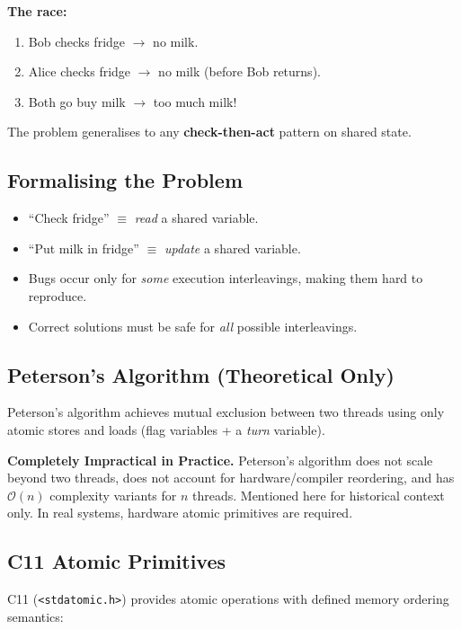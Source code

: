 \documentclass[11pt,a4paper]{article}
\newcommand{\code}[1]{\texttt{#1}}
\begin{document}
\textbf{The race:}
\begin{enumerate}
  \item Bob checks fridge $\to$ no milk.
  \item Alice checks fridge $\to$ no milk (before Bob returns).
  \item Both go buy milk $\to$ too much milk!
\end{enumerate}

The problem generalises to any \textbf{check-then-act} pattern on shared
state.

\subsection{Formalising the Problem}

\begin{itemize}
  \item ``Check fridge'' $\equiv$ \emph{read} a shared variable.
  \item ``Put milk in fridge'' $\equiv$ \emph{update} a shared variable.
  \item Bugs occur only for \emph{some} execution interleavings, making them
    hard to reproduce.
  \item Correct solutions must be safe for \emph{all} possible interleavings.
\end{itemize}

\subsection{Peterson's Algorithm (Theoretical Only)}

Peterson's algorithm achieves mutual exclusion between two threads using only
atomic stores and loads (flag variables + a \emph{turn} variable).

\begin{warnbox}
\textbf{Completely Impractical in Practice.}  Peterson's algorithm does not
scale beyond two threads, does not account for hardware/compiler reordering,
and has $\mathcal{O}(n)$ complexity variants for $n$ threads.  Mentioned here
for historical context only.  In real systems, hardware atomic primitives are
required.
\end{warnbox}

\subsection{C11 Atomic Primitives}

C11 (\code{<stdatomic.h>}) provides atomic operations with defined memory
ordering semantics:
\end{document}
